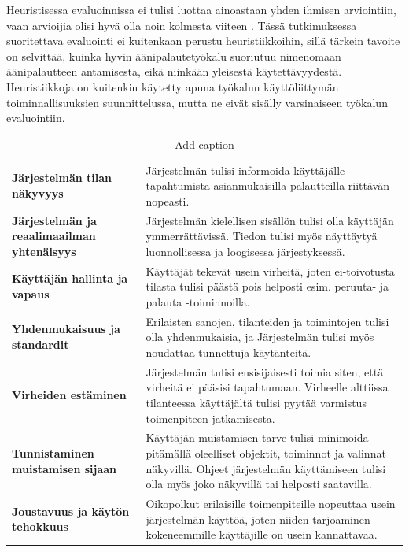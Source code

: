 \documentclass[utf8]{gradu3}
\begin{document}
Heuristisessa evaluoinnissa ei tulisi luottaa ainoastaan yhden ihmisen arviointiin, vaan arvioijia olisi hyvä olla noin kolmesta viiteen \parencite[][]{heuristic-evaluation}. Tässä tutkimuksessa suoritettava evaluointi ei kuitenkaan perustu heuristiikkoihin, sillä tärkein tavoite on selvittää, kuinka hyvin äänipalautetyökalu suoriutuu nimenomaan äänipalautteen antamisesta, eikä niinkään yleisestä käytettävyydestä. Heuristiikkoja on kuitenkin käytetty apuna työkalun käyttöliittymän toiminnallisuuksien suunnittelussa, mutta ne eivät sisälly varsinaiseen työkalun evaluointiin.


\begin{table}[htbp]
  \centering
  \caption{Add caption}
    \begin{tabular}{p{12.355em}p{21.855em}}
    \multicolumn{1}{l}{\textbf{Järjestelmän tilan näkyvyys}} & Järjestelmän tulisi informoida käyttäjälle tapahtumista asianmukaisilla palautteilla riittävän nopeasti. \\
    \textbf{Järjestelmän ja reaalimaailman yhtenäisyys} & Järjestelmän kielellisen sisällön tulisi olla käyttäjän ymmerrättävissä. Tiedon tulisi myös näyttäytyä luonnollisessa ja loogisessa järjestyksessä. \\
    \multicolumn{1}{l}{\textbf{Käyttäjän hallinta ja vapaus}} & Käyttäjät tekevät usein virheitä, joten ei-toivotusta tilasta tulisi päästä pois helposti esim. peruuta- ja palauta -toiminnoilla. \\
    \multicolumn{1}{l}{\textbf{Yhdenmukaisuus ja standardit}} & Erilaisten sanojen, tilanteiden ja toimintojen tulisi olla yhdenmukaisia, ja Järjestelmän tulisi myös noudattaa tunnettuja käytänteitä. \\
    \multicolumn{1}{l}{\textbf{Virheiden estäminen}} & Järjestelmän tulisi ensisijaisesti toimia siten, että virheitä ei pääsisi tapahtumaan. Virheelle alttiissa tilanteessa käyttäjältä tulisi pyytää varmistus toimenpiteen jatkamisesta. \\
    \textbf{Tunnistaminen muistamisen sijaan} & Käyttäjän muistamisen tarve tulisi minimoida pitämällä oleelliset objektit, toiminnot ja valinnat näkyvillä. Ohjeet järjestelmän käyttämiseen tulisi olla myös joko näkyvillä tai helposti saatavilla. \\
    \multicolumn{1}{l}{\textbf{Joustavuus ja käytön tehokkuus}} & Oikopolkut erilaisille toimenpiteille nopeuttaa usein järjestelmän käyttöä, joten niiden tarjoaminen kokeneemmille käyttäjille on usein kannattavaa.  \\

\end{tabular}
\end{table}
\end{document}
